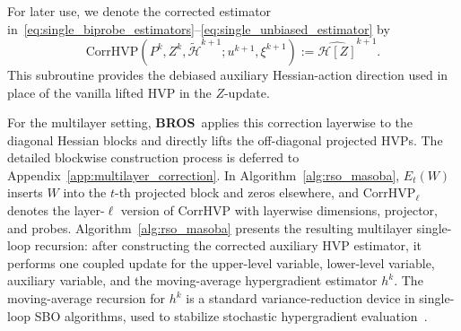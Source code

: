 \documentclass{pkumelon}
\theoremstyle{plain}
\newcommand{\oursname}{\textnormal{\textbf{BROS}}}
\newcommand{\ours}{\oursname\ }
\begin{document}
For later use, we denote the corrected estimator in~\eqref{eq:single_biprobe_estimators}--\eqref{eq:single_unbiased_estimator} by
\[
\mathrm{CorrHVP}(P^k,Z^k,\tilde{\mathcal H}^{k+1};u^{k+1},\xi^{k+1})
:=\widehat{\mathcal H[Z]}^{k+1}.
\]
This subroutine provides the debiased auxiliary Hessian-action direction used in place of the vanilla lifted HVP in the $Z$-update.

For the multilayer setting, \ours applies this correction layerwise to the diagonal Hessian blocks and directly lifts the off-diagonal projected HVPs. The detailed blockwise construction process is deferred to Appendix~\ref{app:multilayer_correction}. In Algorithm~\ref{alg:rso_masoba}, $E_t(W)$ inserts $W$ into the $t$-th projected block and zeros elsewhere, and $\mathrm{CorrHVP}_\ell$ denotes the layer-$\ell$ version of $\mathrm{CorrHVP}$ with layerwise dimensions, projector, and probes. Algorithm~\ref{alg:rso_masoba} presents the resulting multilayer single-loop recursion: after constructing the corrected auxiliary HVP estimator, it performs one coupled update for the upper-level variable, lower-level variable, auxiliary variable, and the moving-average hypergradient estimator $h^k$. The moving-average recursion for $h^k$ is a standard variance-reduction device in single-loop SBO algorithms, used to stabilize stochastic hypergradient evaluation~\cite{chen2024optimal,kong2025decentralized}.


\end{document}

